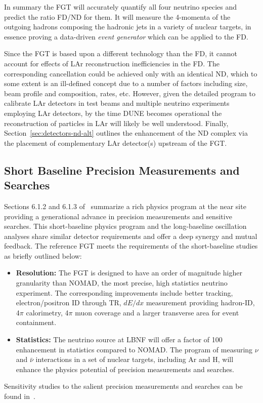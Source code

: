 In summary the FGT will accurately quantify all four neutrino species and
predict the ratio FD/ND for them.  It will measure the 4-momenta of
the outgoing hadrons composing the hadronic jets in a variety of
nuclear targets, in essence proving a data-driven \textit{event generator}
which can be applied to the FD.

Since the FGT is based upon a different technology than the FD, it cannot
account for effects of LAr reconstruction inefficiencies in the
FD. The corresponding cancellation could be achieved only with an
identical ND, which to some extent is an ill-defined concept due to a
number of factors including size, beam profile and composition, rates, 
etc. However, given the detailed program to calibrate
LAr detectors in test beams and  multiple neutrino
experiments employing LAr detectors, by the time DUNE becomes
operational the reconstruction of particles in LAr will likely be well
understood. Finally, Section~\ref{sec:detectors-nd-alt} outlines
the enhancement of the ND complex via the placement of complementary
LAr detector(s) upstream of the FGT.

\subsection{Short Baseline Precision Measurements and Searches} 
\label{cdrsec:detectors-nd-ref-fgt-req-sbp}


Sections 6.1.2
and 6.1.3 of~\cite{cdr-vol-2}
summarize a rich physics program at the near site providing a
generational advance in precision measurements and sensitive searches.
This short-baseline physics program and the long-baseline oscillation
analyses share similar detector requirements and offer a deep synergy
and mutual feedback.  The reference FGT meets the requirements of the
short-baseline studies as briefly outlined below:
\begin{itemize}
    \item {\bf Resolution:} The FGT is designed to have an order of
      magnitude higher granularity than NOMAD, the most precise, high
      statistics neutrino experiment. The corresponding improvements
      include better tracking, electron/positron ID through TR, $dE/dx$
      measurement providing hadron-ID, 4$\pi$ calorimetry, 4$\pi$ muon
      coverage and a larger transverse area for event containment.
    \item {\bf Statistics:} The  neutrino source at LBNF will
      offer a factor of 100 enhancement in statistics compared to
      NOMAD. The program of measuring $\nu$ and $\bar\nu$ interactions
      in a set of nuclear targets, including Ar and H, will enhance
      the physics potential of precision measurements and searches.
\end{itemize}
Sensitivity studies to the salient precision measurements and searches
can be found in~\cite{Adams:2013qkq, DPR}.


